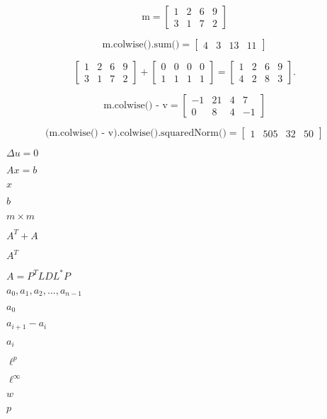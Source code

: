 \documentclass{article}
\begin{document}
\[
\mbox{m} = \begin{bmatrix} 1 & 2 & 6 & 9 \\
                    3 & 1 & 7 & 2 \end{bmatrix}
\]
\pagebreak

\[
\mbox{m.colwise().sum()} = \begin{bmatrix} 4 & 3 & 13 & 11 \end{bmatrix}
\]
\pagebreak

\[
\begin{bmatrix} 1 & 2 & 6 & 9 \\ 3 & 1 & 7 & 2 \end{bmatrix}
+ \begin{bmatrix} 0 & 0 & 0 & 0 \\ 1 & 1 & 1 & 1 \end{bmatrix}
= \begin{bmatrix} 1 & 2 & 6 & 9 \\ 4 & 2 & 8 & 3 \end{bmatrix}.
\]
\pagebreak

\[
  \mbox{m.colwise() - v} = 
  \begin{bmatrix}
    -1 & 21 & 4 & 7 \\
     0 & 8  & 4 & -1
  \end{bmatrix}
\]
\pagebreak

\[
  \mbox{(m.colwise() - v).colwise().squaredNorm()} =
  \begin{bmatrix}
     1 & 505 & 32 & 50
  \end{bmatrix}
\]
\pagebreak

$ \Delta u = 0 $
\pagebreak

$ Ax=b $
\pagebreak

$ x $
\pagebreak

$ b $
\pagebreak

$ m \times m $
\pagebreak

$ A^T + A $
\pagebreak

$ A^T $
\pagebreak

$ A =  P^TLDL^*P $
\pagebreak

$ a_0, a_1, a_2, ..., a_{n-1}$
\pagebreak

$ a_0 $
\pagebreak

$ a_{i+1}-a_{i}$
\pagebreak

$ a_i $
\pagebreak

$ \ell^p $
\pagebreak

$ \ell^\infty $
\pagebreak

$ w $
\pagebreak

$ p $
\pagebreak
\end{document}
